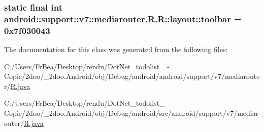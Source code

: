 \hypertarget{classandroid_1_1support_1_1v7_1_1mediarouter_1_1_r_1_1layout_302648b0a52c11a866565fc8d278f58d}{
\subsubsection[{toolbar}]{\setlength{\rightskip}{0pt plus 5cm}static final int android::support::v7::mediarouter.R.R::layout::toolbar = 0x7f030043}}
\label{classandroid_1_1support_1_1v7_1_1mediarouter_1_1_r_1_1layout_302648b0a52c11a866565fc8d278f58d}




The documentation for this class was generated from the following files:\begin{CompactItemize}
\item 
C:/Users/FrBea/Desktop/rendu/DotNet\_\-todolist\_ - Copie/2doo/\_\-2doo.Android/obj/Debug/android/android/support/v7/mediarouter/\hyperlink{android_2support_2v7_2mediarouter_2_r_8java}{R.java}\item 
C:/Users/FrBea/Desktop/rendu/DotNet\_\-todolist\_ - Copie/2doo/\_\-2doo.Android/obj/Debug/android/src/android/support/v7/mediarouter/\hyperlink{src_2android_2support_2v7_2mediarouter_2_r_8java}{R.java}\end{CompactItemize}
